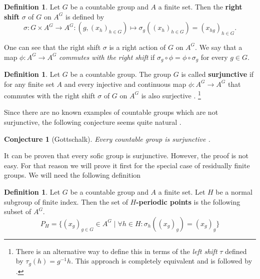 \documentclass[titlepage, a4paper]{article}
\newtheorem{conjecture}[theorem]{Conjecture}
\theoremstyle{definition}
\newtheorem{definition}[theorem]{Definition}
\theoremstyle{remark}
\begin{document}
    \begin{definition}
	    Let $G$ be a countable group and $A$ a finite set. Then the \textbf{right shift} $\sigma$ of $G$ on $A^G$ is defined by
        \[
        \sigma: G \times A^G \to A^G: \left(g, (x_{h})_{h \in G} \right) \mapsto \sigma_g((x_{h})_{h \in G}) = \left( x_{hg} \right)_{h \in G}.
        \]
    \end{definition}

    One can see that the right shift $\sigma$ is a right action of $G$ on $A^G$. We say that a map $\phi: A^G \to A^G$ \emph{commutes with the right shift} if $\sigma_g \circ \phi = \phi \circ \sigma_g$ for every $g \in G$.
    
    \begin{definition}
	    Let $G$ be a countable group. The group $G$ is called \textbf{surjunctive} if for any finite set $A$ and every injective and continuous map $\phi: A^{G}\to A^{G}$ that commutes with the right shift $\sigma$ of $G$ on $A^G$ is also surjective \cite[section 1]{weiss_2000} .
	    \footnote{There is an alternative way to define this in terms of the \emph{left shift} $\tau$ defined by $\tau_g(h)= g^{-1}h$. This approach is completely equivalent and is followed by \cite[paragraph 2.13.5 - 2.13.7]{capraro_lupini_2015}.}
    \end{definition}

Since there are no known examples of countable groups which are not surjunctive, the following conjecture seems quite natural \cite[introduction]{weiss_2000}.

    \begin{conjecture}[Gottschalk] \label{conj:gottschalk}
        Every countable group is surjunctive  .
    \end{conjecture}

    It can be proven that every sofic group is surjunctive. However, the proof is not easy. For that reason we will prove it first for the special case of residually finite groups. We will need the following definition
\begin{definition}
    Let $G$ be a countable group and $A$ a finite set. Let $H$ be a normal subgroup of finite index. Then the set of \textbf{$H$-periodic points} is the following subset of $A^G$.
        \[
        P_H = \{ (x_g)_{g \in G} \in A^G  \mid \forall h \in H: \sigma_h((x_g)_g) = (x_g)_g\}
        \]
\end{definition}
\end{document}
